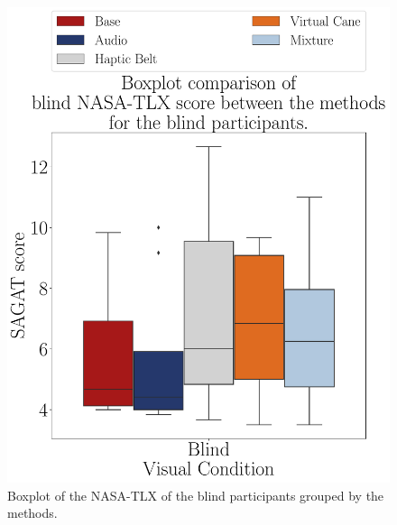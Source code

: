 \begin{figure}[!htb]
    \centering
    \begin{minipage}{0.45\textwidth}
        \centering
        \includegraphics[width = \textwidth]{Resultados/Nasa/Figuras/pdf/boxplot_nasa_blind_scene.pdf}
        \caption{Boxplot of the NASA-TLX of the blind participants grouped by the methods.}
        \label{fig:boxplot_nasa_blind_scene}
    \end{minipage}
    \begin{minipage}{0.075\textwidth}
        \hfill
    \end{minipage}
    \begin{minipage}{0.45\textwidth}
        \centering

\end{minipage}
\end{figure}
